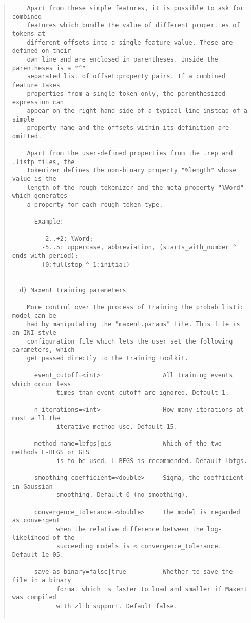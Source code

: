 \begin{scriptsize}
\begin{quote}
\begin{verbatim}
    Apart from these simple features, it is possible to ask for combined
    features which bundle the value of different properties of tokens at
    different offsets into a single feature value. These are defined on their
    own line and are enclosed in parentheses. Inside the parentheses is a "^"
    separated list of offset:property pairs. If a combined feature takes
    properties from a single token only, the parenthesized expression can
    appear on the right-hand side of a typical line instead of a simple
    property name and the offsets within its definition are omitted.

    Apart from the user-defined properties from the .rep and .listp files, the
    tokenizer defines the non-binary property "%length" whose value is the
    length of the rough tokenizer and the meta-property "%Word" which generates
    a property for each rough token type.

      Example:
        
        -2..+2: %Word;
        -5..5: uppercase, abbreviation, (starts_with_number ^ ends_with_period);
        (0:fullstop ^ 1:initial)
        

  d) Maxent training parameters

    More control over the process of training the probabilistic model can be
    had by manipulating the "maxent.params" file. This file is an INI-style
    configuration file which lets the user set the following parameters, which
    get passed directly to the training toolkit.

      event_cutoff=<int>                 All training events which occur less
            times than event_cutoff are ignored. Default 1.

      n_iterations=<int>                 How many iterations at most will the
            iterative method use. Default 15.

      method_name=lbfgs|gis              Which of the two methods L-BFGS or GIS
            is to be used. L-BFGS is recommended. Default lbfgs.

      smoothing_coefficient=<double>     Sigma, the coefficient in Gaussian
            smoothing. Default 0 (no smoothing).

      convergence_tolerance=<double>     The model is regarded as convergent
            when the relative difference between the log-likelihood of the
            succeeding models is < convergence_tolerance. Default 1e-05.

      save_as_binary=false|true          Whether to save the file in a binary
            format which is faster to load and smaller if Maxent was compiled
            with zlib support. Default false.


\end{verbatim}
\end{quote}
\end{scriptsize}
